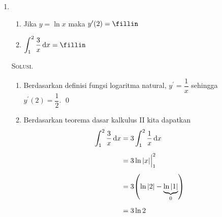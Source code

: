 \documentclass{exam}
\renewenvironment{proof}[1][Solusi.]{\ProofBox\strut\textsc{#1}\space}{\endProofBox}
\numberwithin{equation}{section}
\begin{document}
\begin{enumerate}
\begin{proof}
{\begin{tikzpicture}[x=0.75pt,y=0.75pt,yscale=-1,xscale=1]
\end{tikzpicture}
    \par}
    
    Berdasarkan ilustrasi di atas, luas satu irisan kecil dari daerah $R$ adalah
    \[\dd{A} = (9 - x^2) \dd{x}\]

    Mengingat daerah $R$ memanjang dari $x = -3$ hingga $x = 3$, luas daerah $R$ adalah 
        \[A_R = \int_{-3}^{3} \dd{A} = \int_{-3}^{3} (9 - x^2) \dd{x}\]

    Mencocokkan bentuk di atas dengan $\displaystyle\int_{-a}^{a} h(x) \dd{x}$, didapatkan $a = 3$ dan $h(x) = 9 - x^2$. \qed
    
\end{proof}\vspace{1em}

\item 
\begin{enumerate}
    \item Jika $y = \ln x$ maka $y^\prime(2) = \fillin$
    \item $\displaystyle \int_{1}^{2} \frac{3}{x} \dd{x} = \fillin$
\end{enumerate}

\begin{proof}
        \begin{enumerate}[label=(\alph*)]
            \item Berdasarkan definisi fungsi logaritma natural, $y^\prime = \dfrac{1}{x}$ sehingga $y^\prime(2) = \dfrac{1}{2}.$ \qed
            \item Berdasarkan teorema dasar kalkulus II kita dapatkan
            \begin{align*}
            \int_{1}^{2} \frac{3}{x} \dd{x} &= 3\int_{1}^{2} \frac{1}{x} \dd{x}         \\[.5em]
                                            &= 3\ln|x|\Big|_{1}^{2}                     \\[.5em]
                                            &= 3 \qty(\ln|2| - \underbrace{\ln|1|}_{0}) \\[.5em]
                                            &= 3 \ln 2
            \end{align*}
        \end{enumerate}
\end{proof}\vspace{1em}


\end{enumerate}
\end{document}
